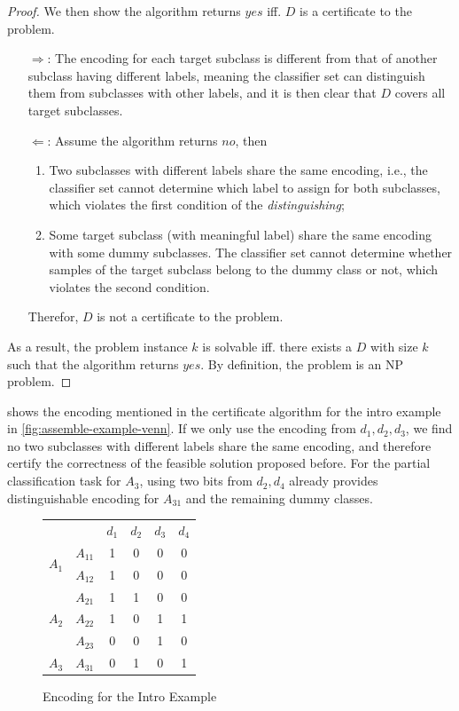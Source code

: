 \documentclass[sigplan,10pt,review]{acmart}\settopmatter{printfolios=true,printccs=false,printacmref=false}
\begin{document}
\begin{proof}
We then show the algorithm returns $yes$ iff. $D$ is a certificate to the problem.
\begin{enumerate}
	\item[$\Rightarrow$:]
	The encoding for each target subclass is different from that of another subclass having different labels, meaning the classifier set can distinguish them from subclasses with other labels, and it is then clear that $D$ covers all target subclasses.
	\item[$\Leftarrow$:]
	Assume the algorithm returns $no$, then
	\begin{enumerate}
		\item Two subclasses with different labels share the same encoding, i.e., the classifier set cannot determine which label to assign for both subclasses, which violates the first condition of the \textit{distinguishing};
		\item Some target subclass (with meaningful label) share the same encoding with some dummy subclasses.
		The classifier set cannot determine whether samples of the target subclass belong to the dummy class or not, which violates the second condition.
	\end{enumerate}
	Therefor, $D$ is not a certificate to the problem.
\end{enumerate}
As a result, the problem instance $k$ is solvable iff. there exists a $D$ with size $k$ such that the algorithm returns $yes$.
By definition, the problem is an NP problem.
\end{proof}

 shows the encoding mentioned in the certificate algorithm for the intro example in \cref{fig:assemble-example-venn}.
If we only use the encoding from $d_1, d_2, d_3$, we find no two subclasses with different labels share the same encoding, and therefore certify the correctness of the feasible solution proposed before.
For the partial classification task for $A_3$, using two bits from $d_2, d_4$ already provides distinguishable encoding for $A_{31}$ and the remaining dummy classes.

\begin{figure}[h]
	\begin{tabular}{|c|c|cccc|}
	\cline{1-6}
	\multicolumn{2}{|c|}{} & $d_1$ & $d_2$ & $d_3$ & $d_4$ \\ \cline{1-6}
	\multirow{2}{*}{$A_1$} & $A_{11}$ & 1 & 0 & 0 & 0 \\ \cline{2-6}
	 & $A_{12}$ & 1 & 0 & 0 & 0 \\ \cline{1-6}
	\multirow{3}{*}{$A_2$} & $A_{21}$ & 1 & 1 & 0 & 0 \\ \cline{2-6}
	 & $A_{22}$ & 1 & 0 & 1 & 1 \\ \cline{2-6}
	 & $A_{23}$ & 0 & 0 & 1 & 0 \\ \cline{1-6}
	$A_3$ & $A_{31}$ & 0 & 1 & 0 & 1 \\ \cline{1-6}
	\end{tabular}
	\caption{Encoding for the Intro Example}
	\label{fig:assemble-example-encoding}
\end{figure}
\end{document}
